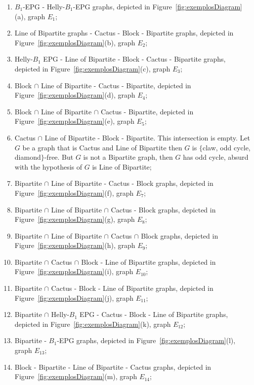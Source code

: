 \begin{enumerate}[label=(\arabic*)]
    \item $B_1$-EPG  - Helly-$B_1$-EPG graphs, depicted in Figure~\ref{fig:exemplosDiagram}(a), graph $E_1$;%
    
    \item Line of Bipartite graphs  - Cactus - Block - Bipartite graphs, depicted in Figure~\ref{fig:exemplosDiagram}(b), graph $E_2$;%
    \item Helly-$B_1$ EPG - Line of Bipartite - Block - Cactus - Bipartite graphs, depicted in Figure~\ref{fig:exemplosDiagram}(c), graph $E_3$;%
    \item Block $\cap$ Line of Bipartite - Cactus - Bipartite, depicted in Figure~\ref{fig:exemplosDiagram}(d), graph $E_4$;%
    \item Block $\cap$ Line of Bipartite $\cap$  Cactus - Bipartite, depicted in Figure~\ref{fig:exemplosDiagram}(e), graph $E_5$;%
    \item Cactus $\cap$ Line of Bipartite - Block - Bipartite. This intersection is empty. Let $G$ be a graph that is Cactus and Line of Bipartite then $G$ is $\{$claw, odd cycle, diamond$\}$-free. But $G$ is not a Bipartite graph, then $G$ has odd cycle, %
     absurd with the hypothesis of $G$ is Line of Bipartite;%
    \item Bipartite $\cap$ Line of Bipartite  - Cactus - Block graphs, depicted in Figure~\ref{fig:exemplosDiagram}(f), graph $E_7$;%
    \item Bipartite $\cap$ Line of Bipartite $\cap$  Cactus - Block graphs, depicted in Figure~\ref{fig:exemplosDiagram}(g), graph $E_8$;%
    \item Bipartite $\cap$ Line of Bipartite $\cap$  Cactus $\cap$ Block graphs, depicted in Figure~\ref{fig:exemplosDiagram}(h), graph $E_9$;%
  \item Bipartite $\cap$  Cactus $\cap$ Block - Line of Bipartite graphs, depicted in Figure~\ref{fig:exemplosDiagram}(i), graph $E_{10}$;%
    \item Bipartite  $\cap$  Cactus - Block -  Line of Bipartite graphs, depicted in Figure~\ref{fig:exemplosDiagram}(j), graph $E_{11}$;%
     \item Bipartite $\cap$ Helly-$B_1$ EPG - Cactus - Block -  Line of Bipartite graphs, depicted in Figure~\ref{fig:exemplosDiagram}(k), graph $E_{12}$;%
      \item Bipartite - $B_1$-EPG graphs, depicted in Figure~\ref{fig:exemplosDiagram}(l), graph $E_{13}$;%
      \item Block - Bipartite - Line of Bipartite  - Cactus graphs, depicted in Figure~\ref{fig:exemplosDiagram}(m), graph $E_{14}$;%
 

\end{enumerate}
